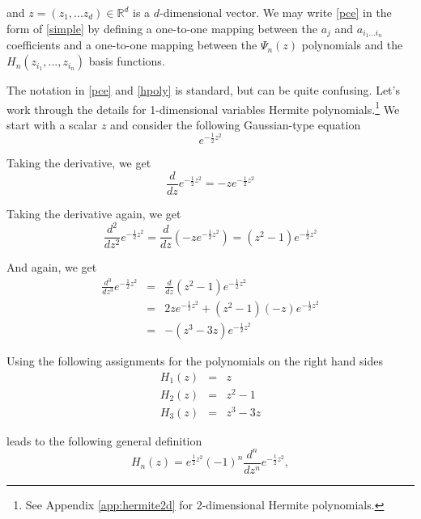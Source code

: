 \documentclass[11pt]{article}
\numberwithin{equation}{section}
\begin{document}
and $z = (z_1, ... z_d) \in \mathbb{R}^d$ is a $d$-dimensional vector.  We may write \eqref{pce} in the form of \eqref{simple} by defining a one-to-one mapping between the $a_j$ and $a_{i_1 ... i_n}$ coefficients and a one-to-one mapping between the $\Psi_n(z)$ polynomials and the $H_n(z_{i_1}, ..., z_{i_n})$ basis functions.

\qquad The notation in \eqref{pce} and \eqref{hpoly} is standard, but can be quite confusing. Let's work through the details for 1-dimensional variables Hermite polynomials.\footnote{See Appendix \ref{app:hermite2d} for 2-dimensional Hermite polynomials.} We start with a scalar $z$ and consider the following Gaussian-type equation
\begin{equation}
e^{-\frac{1}{2} z^2} \label{gaussian_exp}
\end{equation}

Taking the derivative, we get
\begin{equation*}
\frac{d}{dz} e^{-\frac{1}{2} z^2} = -z e^{-\frac{1}{2} z^2}
\end{equation*}

Taking the derivative again, we get 
\begin{equation*}
\frac{d^2}{dz^2} e^{-\frac{1}{2} z^2} = \frac{d}{dz} \left( -z e^{-\frac{1}{2} z^2} \right) = \left( z^2 - 1 \right) e^{-\frac{1}{2} z^2}
\end{equation*}

And again, we get 
\begin{eqnarray*}
\frac{d^3}{dz^3} e^{-\frac{1}{2} z^2} & = & \frac{d}{dz} \left( z^2 - 1 \right) e^{-\frac{1}{2} z^2} \nonumber \\
& = & 2 z e^{-\frac{1}{2} z^2} + (z^2 - 1) (-z) e^{-\frac{1}{2} z^2} \nonumber \\
& = & -( z^3 - 3 z) e^{-\frac{1}{2} z^2}
\end{eqnarray*}

Using the following assignments for the polynomials on the right hand sides
\begin{eqnarray*}
H_1(z) & = & z \\
H_2(z) & = & z^2 - 1 \\
H_3(z) & = & z^3 - 3 z
\end{eqnarray*}

leads to the following general definition
\begin{equation}
H_n(z) = e^{\frac{1}{2} z^2} (-1)^n \frac{d^n}{dz^n} e^{-\frac{1}{2} z^2}, \label{hpoly1d}
\end{equation}
\end{document}

